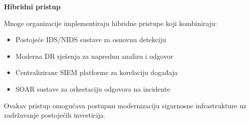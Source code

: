 \textbf{Hibridni pristup}

Mnoge organizacije implementiraju hibridne pristupe koji kombiniraju:
\begin{itemize}
\item Postojeće IDS/NIDS sustave za osnovnu detekciju
\item Moderna DR rješenja za naprednu analizu i odgovor
\item Centralizirane SIEM platforme za korelaciju događaja
\item SOAR sustave za orkestaciju odgovora na incidente
\end{itemize}

Ovakav pristup omogućava postupnu modernizaciju sigurnosne infrastrukture uz zadržavanje postojećih investicija.
